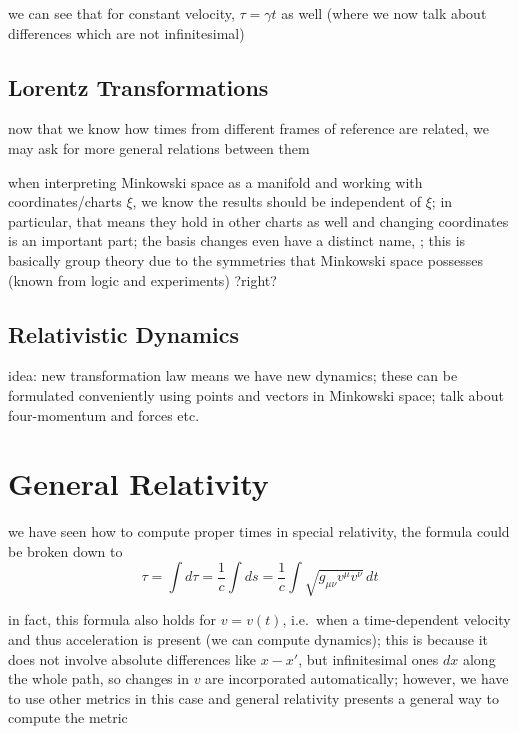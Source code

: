 we can see that for constant velocity, $\tau = \gamma t$ as well (where we now talk about differences which are not infinitesimal)



		\subsection{Lorentz Transformations}
now that we know how times from different frames of reference are related, we may ask for more general relations between them


when interpreting Minkowski space as a manifold and working with coordinates/charts $\xi$, we know the results should be independent of $\xi$; in particular, that means they hold in other charts as well and changing coordinates is an important part; the basis changes even have a distinct name, ; this is basically group theory due to the symmetries that Minkowski space possesses (known from logic and experiments) ?right?



		\subsection{Relativistic Dynamics}
idea: new transformation law means we have new dynamics; these can be formulated conveniently using points and vectors in Minkowski space; talk about four-momentum and forces etc.


\newpage


	\section{General Relativity}
we have seen how to compute proper times in special relativity, the formula could be broken down to 
\begin{equation}
\tau = \int d\tau = \frac{1}{c} \int ds = \frac{1}{c} \int \sqrt{g_{\mu \nu} v^\mu v^\nu} \, dt
\end{equation}

in fact, this formula also holds for $v = v(t)$, i.e.~when a time-dependent velocity and thus acceleration is present (we can compute dynamics); this is because it does not involve absolute differences like $x - x'$, but infinitesimal ones $dx$ along the whole path, so changes in $v$ are incorporated automatically; however, we have to use other metrics in this case and general relativity presents a general way to compute the metric




